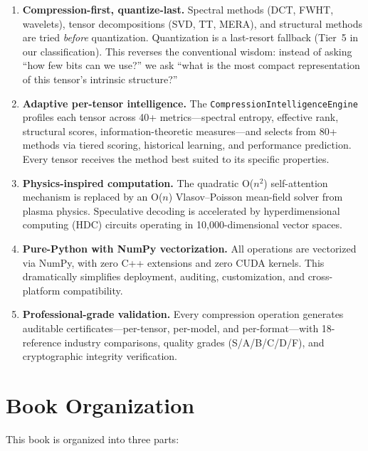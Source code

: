 \documentclass[11pt,a4paper,openright]{book}
\begin{document}
\begin{enumerate}
	\item \textbf{Compression-first, quantize-last.} Spectral methods (DCT, FWHT, wavelets), tensor decompositions (SVD, TT, MERA), and structural methods are tried \emph{before} quantization. Quantization is a last-resort fallback (Tier~5 in our classification). This reverses the conventional wisdom: instead of asking ``how few bits can we use?'' we ask ``what is the most compact representation of this tensor's intrinsic structure?''

	\item \textbf{Adaptive per-tensor intelligence.} The \texttt{CompressionIntelligenceEngine} profiles each tensor across 40+ metrics---spectral entropy, effective rank, structural scores, information-theoretic measures---and selects from 80+ methods via tiered scoring, historical learning, and performance prediction. Every tensor receives the method best suited to its specific properties.

	\item \textbf{Physics-inspired computation.} The quadratic O($n^2$) self-attention mechanism is replaced by an O($n$) Vlasov--Poisson mean-field solver from plasma physics. Speculative decoding is accelerated by hyperdimensional computing (HDC) circuits operating in 10,000-dimensional vector spaces.

	\item \textbf{Pure-Python with NumPy vectorization.} All operations are vectorized via NumPy, with zero C++ extensions and zero CUDA kernels. This dramatically simplifies deployment, auditing, customization, and cross-platform compatibility.

	\item \textbf{Professional-grade validation.} Every compression operation generates auditable certificates---per-tensor, per-model, and per-format---with 18-reference industry comparisons, quality grades (S/A/B/C/D/F), and cryptographic integrity verification.
\end{enumerate}

\section{Book Organization}

This book is organized into three parts:
\end{document}
